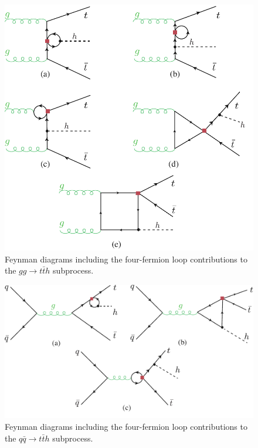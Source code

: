 \begin{figure}[t!]
	\centering
	\includegraphics[scale=0.85]{./fig/ggttH-4F_NLO}
	\caption{Feynman diagrams including the four-fermion loop contributions to the $ gg \to t\bar{t} h$ subprocess.}
	\label{ggtth}
\end{figure}
\begin{figure}[ht!]
	\centering
	\includegraphics[scale=0.85]{./fig/qqttH-4F_NLO}
	\caption{Feynman diagrams including the four-fermion loop contributions to the  $ q \bar{q} \to t\bar{t} h$ subprocess.}
	\label{qqtth}
\end{figure}

